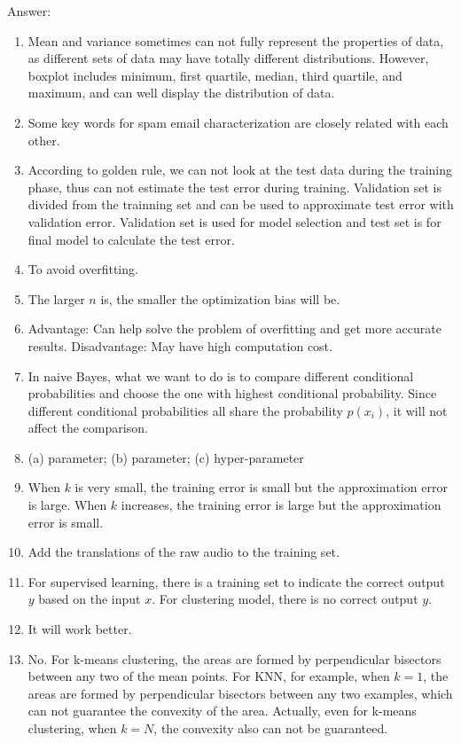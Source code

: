 \documentclass{article}
\def\gre#1{{\color{gre}#1}}
\begin{document}
\gre{Answer:
\begin{enumerate}
    \item Mean and variance sometimes can not fully represent the properties of data, as different sets of data may have totally different distributions. However, boxplot includes minimum, first quartile, median, third quartile, and maximum, and can well display the distribution of data.
    \item Some key words for spam email characterization are closely related with each other.
    \item According to golden rule, we can not look at the test data during the training phase, thus can not estimate the test error during training. Validation set is divided from the trainning set and can be used to approximate test error with validation error.
    Validation set is used for model selection and test set is for final model to calculate the test error.
    \item To avoid overfitting.
    \item The larger $n$ is, the smaller the optimization bias will be.
    \item Advantage: Can help solve the problem of overfitting and get more accurate results.
    Disadvantage: May have high computation cost.
    \item In naive Bayes, what we want to do is to compare different conditional probabilities and choose the one with highest conditional probability. Since different conditional probabilities all share the probability $p(x_i)$, it will not affect the comparison.
    \item (a) parameter; (b) parameter; (c) hyper-parameter
    \item When $k$ is very small, the training error is small but the approximation error is large. When $k$ increases, the training error is large but the approximation error is small.
    \item Add the translations of the raw audio to the training set.
    \item For supervised learning, there is a training set to indicate the correct output $y$ based on the input $x$. For clustering model, there is no correct output $y$.
    \item It will work better.
    \item No. For k-means clustering, the areas are formed by perpendicular bisectors between any two of the mean points.
    For KNN, for example, when $k=1$, the areas are formed  by perpendicular bisectors between any two examples, which can not guarantee the convexity of the area. Actually, even for k-means clustering, when $k=N$, the convexity also can not be guaranteed.
\end{enumerate}
}
\end{document}
